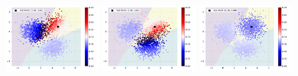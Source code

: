 \begin{frame}
\begin{figure}[ht]
        \includegraphics[width=0.32\textwidth]{c4_figures/test_kernel_example_class_00_sample_02.pdf}
        \includegraphics[width=0.32\textwidth]{c4_figures/test_kernel_example_class_01_sample_02.pdf}
        \includegraphics[width=0.32\textwidth]{c4_figures/test_kernel_example_class_02_sample_02.pdf}
    \end{figure}
\end{frame}



